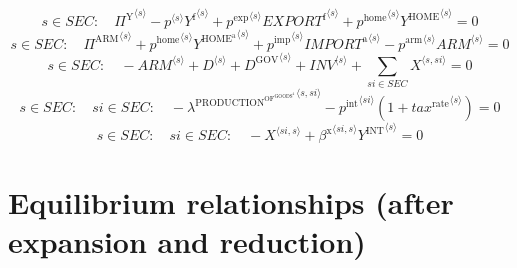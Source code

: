 \begin{equation}
s\in {S\!E\!C}\colon\quad {\Pi^{\mathrm{Y}}}^{\langle s\rangle} - {{p}^{\langle s\rangle}} {{Y^{\mathrm{f}}}^{\langle s\rangle}} + {{p^{\mathrm{exp}}}^{\langle s\rangle}} {{{E\!X\!P\!O\!R\!T}^{\mathrm{f}}}^{\langle s\rangle}} + {{p^{\mathrm{home}}}^{\langle s\rangle}} {{Y^{\mathrm{HOME}}}^{\langle s\rangle}} = 0
\end{equation}
\begin{equation}
s\in {S\!E\!C}\colon\quad {\Pi^{\mathrm{ARM}}}^{\langle s\rangle} + {{p^{\mathrm{home}}}^{\langle s\rangle}} {{Y^{\mathrm{HOME}^{\mathrm{a}}}}^{\langle s\rangle}} + {{p^{\mathrm{imp}}}^{\langle s\rangle}} {{{I\!M\!P\!O\!R\!T}^{\mathrm{a}}}^{\langle s\rangle}} - {{p^{\mathrm{arm}}}^{\langle s\rangle}} {{{A\!R\!M}}^{\langle s\rangle}} = 0
\end{equation}
\begin{equation}
s\in {S\!E\!C}\colon\quad -{{A\!R\!M}}^{\langle s\rangle} + {D}^{\langle s\rangle} + {D^{\mathrm{GOV}}}^{\langle s\rangle} + {{I\!N\!V}}^{\langle s\rangle} + \sum_{{s\!i}\in {S\!E\!C}} {X}^{\langle s,{s\!i}\rangle} = 0
\end{equation}
\begin{equation}
s\in {S\!E\!C}\colon\quad {s\!i}\in {S\!E\!C}\colon\quad -{\lambda^{\mathrm{PRODUCTION}^{\mathrm{OF}^{\mathrm{GOODS}^{\mathrm{4}}}}}}^{\langle s,{s\!i}\rangle} - {{p^{\mathrm{int}}}^{\langle {s\!i}\rangle}} \left(1 + {{t\!a\!x}^{\mathrm{rate}}}^{\langle s\rangle}\right) = 0
\end{equation}
\begin{equation}
s\in {S\!E\!C}\colon\quad {s\!i}\in {S\!E\!C}\colon\quad -{X}^{\langle {s\!i},s\rangle} + {{\beta^{\mathrm{x}}}^{\langle {s\!i},s\rangle}} {{Y^{\mathrm{INT}}}^{\langle s\rangle}} = 0
\end{equation}



\section{Equilibrium relationships (after expansion and reduction)}

